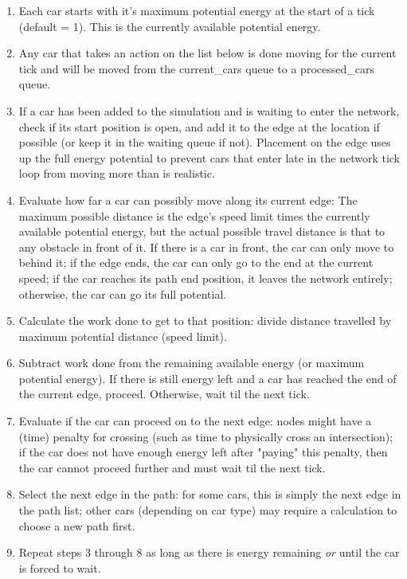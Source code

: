 \begin{enumerate}
    \item Each car starts with it's maximum potential energy at the start of a tick (default = 1).  This is the currently available potential energy.
    \item Any car that takes an action on the list below is done moving for the current tick and will be moved from the current\_cars queue to a processed\_cars queue.
    \item If a car has been added to the simulation and is waiting to enter the network, check if its start position is open, and add it to the edge at the location if possible (or keep it in the waiting queue if not).  Placement on the edge uses up the full energy potential to prevent cars that enter late in the network tick loop from moving more than is realistic.
    \item Evaluate how far a car can possibly move along its current edge:  The maximum possible distance is the edge's speed limit times the currently available potential energy, but the actual possible travel distance is that to any obstacle in front of it.  If there is a car in front, the car can only move to behind it; if the edge ends, the car can only go to the end at the current speed; if the car reaches its path end position, it leaves the network entirely; otherwise, the car can go its full potential.  
    \item Calculate the work done to get to that position:  divide distance travelled by maximum potential distance (speed limit).
    \item Subtract work done from the remaining available energy (or maximum potential energy).  If there is still energy left and a car has reached the end of the current edge, proceed.  Otherwise, wait til the next tick.
    \item Evaluate if the car can proceed on to the next edge:  nodes might have a (time) penalty for crossing (such as time to physically cross an intersection); if the car does not have enough energy left after "paying" this penalty, then the car cannot proceed further and must wait til the next tick.
    \item Select the next edge in the path:  for some cars, this is simply the next edge in the path list; other cars (depending on car type) may require a calculation to choose a new path first.
    \item Repeat steps 3 through 8 as long as there is energy remaining \textit{or} until the car is forced to wait.
\end{enumerate}

